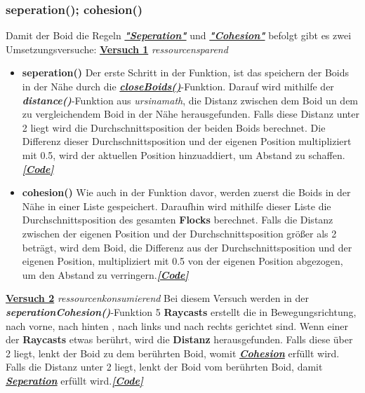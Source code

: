 \documentclass[a4paper, hidelinks, 12pt]{article}
\begin{document}
\subsubsection{seperation(); cohesion()}\label{seperationCohesion}
Damit der Boid die Regeln \hyperref[IdeeSeperation]{\textbf{\emph{"Seperation"}}} und \hyperref[IdeeCohesion]{\textbf{\emph{"Cohesion"}}} befolgt gibt es zwei Umsetzungsversuche:\newline\newline
\underline{\textbf{Versuch 1}} \emph{ressourcensparend}
\begin{itemize}
	\item \textbf{seperation()}\label{Umsetzungseperation}\newline
	Der erste Schritt in der Funktion, ist das speichern der Boids in der Nähe durch die \hyperref[UmsetzungcloseBoids]{\textbf{\emph{closeBoids()}}}-Funktion. Darauf wird mithilfe der \textbf{\emph{distance()}}-Funktion aus \emph{ursinamath}, die Distanz\cite{distance} zwischen dem Boid un dem zu vergleichendem Boid in der Nähe herausgefunden. Falls diese Distanz unter 2 liegt wird die Durchschnittsposition der beiden Boids berechnet. Die Differenz dieser Durchschnittsposition und der eigenen Position multipliziert mit 0.5, wird der aktuellen Position hinzuaddiert, um Abstand zu schaffen.\hyperref[Codeseperation]{\textbf{\emph{[Code]}}}
	\item \textbf{cohesion()}\label{Umsetzungcohesion}\newline
	Wie auch in der Funktion davor, werden zuerst die Boids in der Nähe in einer Liste gespeichert. Daraufhin wird mithilfe dieser Liste die Durchschnittsposition des gesamten \textbf{Flocks} berechnet. Falls die Distanz\cite{distance} zwischen der eigenen Position und der Durchschnittsposition größer als 2 beträgt, wird dem Boid, die Differenz aus der Durchschnittsposition und der eigenen Position, multipliziert mit 0.5 von der eigenen Position abgezogen, um den Abstand zu verringern.\hyperref[Codecohesion]{\textbf{\emph{[Code]}}}
\end{itemize}
\newpage
\underline{\textbf{Versuch 2}} \emph{ressourcenkonsumierend}\label{UmsetzungseperationCohesion}\newline
Bei diesem Versuch werden in der \textbf{\emph{seperationCohesion()}}-Funktion 5 \textbf{Raycasts} erstellt die in Bewegungsrichtung, nach vorne, nach hinten , nach links und nach rechts gerichtet sind. Wenn einer der \textbf{Raycasts}\cite{raycast} etwas berührt, wird die \textbf{Distanz}\cite{HitInfo} herausgefunden. Falls diese über 2 liegt, lenkt der Boid zu dem berührten Boid, womit \hyperref[IdeeCohesion]{\textbf{\emph{Cohesion}}} erfüllt wird. Falls die Distanz unter 2 liegt, lenkt der Boid vom berührten Boid, damit \hyperref[IdeeSeperation]{\textbf{\emph{Seperation}}} erfüllt wird.\hyperref[CodeseperationCohesion]{\textbf{\emph{[Code]}}}
\end{document}

